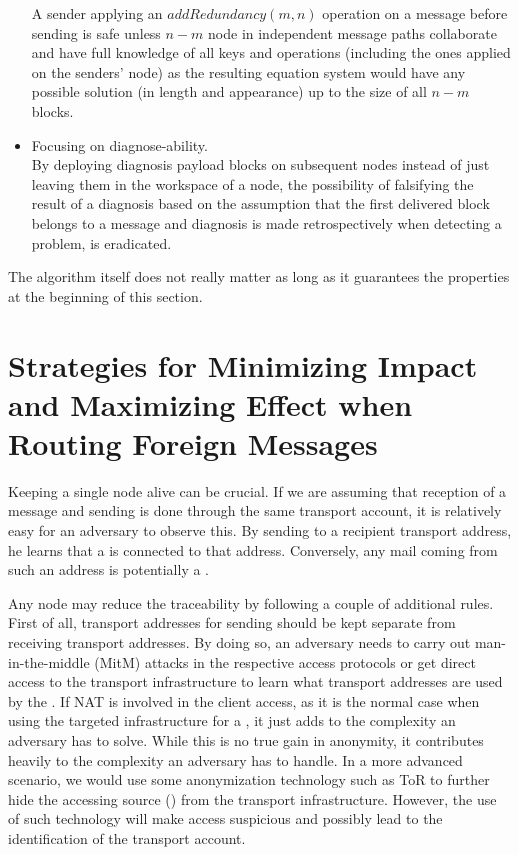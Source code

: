 \begin{itemize}
	A sender applying an $addRedundancy(m,n)$ operation on a message before sending is safe unless $n-m$ node in independent message paths collaborate and have full knowledge of all keys and operations (including the ones applied on the senders' node) as the resulting equation system would have any possible solution (in length and appearance) up to the size of all $n-m$ blocks.
	\item Focusing on diagnose-ability.\\
	By deploying diagnosis payload blocks on subsequent nodes instead of just leaving them in the workspace of a node, the possibility of falsifying the result of a diagnosis based on the assumption that the first delivered block belongs to a message and diagnosis is made retrospectively when detecting a problem, is eradicated.
\end{itemize}

The algorithm itself does not really matter as long as it guarantees the properties at the beginning of this section.

\section{Strategies for Minimizing Impact and Maximizing Effect when Routing Foreign Messages}
Keeping a single node alive can be crucial. If we are assuming that reception of a message and sending is done through the same transport account, it is relatively easy for an adversary to observe this. By sending to a recipient transport address, he learns that a \VortexNode{} is connected to that address. Conversely, any mail coming from such an address is potentially a \VortexMessage{}.

Any node may reduce the traceability by following a couple of additional rules. First of all, transport addresses for sending should be kept separate from receiving transport addresses. By doing so, an adversary needs to carry out man-in-the-middle (MitM) attacks in the respective access protocols or get direct access to the transport infrastructure to learn what transport addresses are used by the \VortexNode{}. If NAT is involved in the client access, as it is the normal case when using the targeted infrastructure for a \VortexNode, it just adds to the complexity an adversary has to solve. While this is no true gain in anonymity, it contributes heavily to the complexity an adversary has to handle. In a more advanced scenario, we would use some anonymization technology such as ToR to further hide the accessing source (\VortexNode) from the transport infrastructure. However, the use of such technology will make access suspicious and possibly lead to the identification of the transport account.

